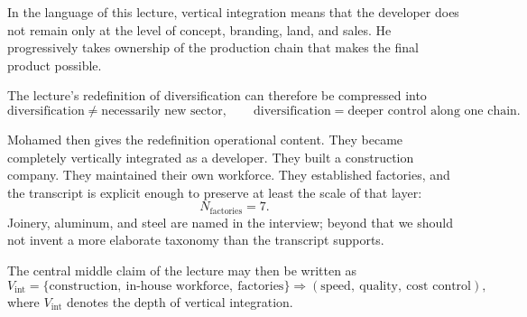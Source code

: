\begin{definition}
In the language of this lecture, vertical integration means that the developer does not remain only at the level of concept, branding, land, and sales. He progressively takes ownership of the production chain that makes the final product possible.
\end{definition}

The lecture's redefinition of diversification can therefore be compressed into
\begin{equation}
\text{diversification} \neq \text{necessarily new sector},
\qquad
\text{diversification} = \text{deeper control along one chain}.
\end{equation}

Mohamed then gives the redefinition operational content. They became completely vertically integrated as a developer. They built a construction company. They maintained their own workforce. They established factories, and the transcript is explicit enough to preserve at least the scale of that layer:
\begin{equation}
N_{\text{factories}} = 7.
\end{equation}
Joinery, aluminum, and steel are named in the interview; beyond that we should not invent a more elaborate taxonomy than the transcript supports.

The central middle claim of the lecture may then be written as
\begin{equation}
V_{\text{int}}
=
\{\text{construction},\ \text{in-house workforce},\ \text{factories}\}
\Longrightarrow
(\text{speed},\ \text{quality},\ \text{cost control}),
\end{equation}
where \(V_{\text{int}}\) denotes the depth of vertical integration.

\begin{figure}[h]
\centering
{}
\end{figure}


